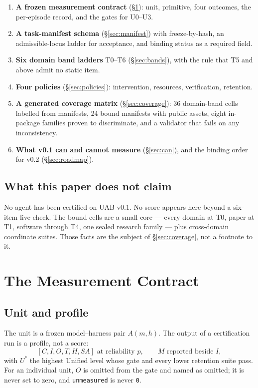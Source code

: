 \begin{enumerate}[leftmargin=*]
\item \textbf{A frozen measurement contract} (\S\ref{sec:contract}): unit, primitive, four outcomes, the per-episode record, and the gates for U0--U3.
\item \textbf{A task-manifest schema} (\S\ref{sec:manifest}) with freeze-by-hash, an admissible-locus ladder for acceptance, and binding status as a required field.
\item \textbf{Six domain band ladders} T0--T6 (\S\ref{sec:bands}), with the rule that T5 and above admit no static item.
\item \textbf{Four policies} (\S\ref{sec:policies}): intervention, resources, verification, retention.
\item \textbf{A generated coverage matrix} (\S\ref{sec:coverage}): 36 domain-band cells labelled from manifests, 24 bound manifests with public assets, eight in-package families proven to discriminate, and a validator that fails on any inconsistency.
\item \textbf{What v0.1 can and cannot measure} (\S\ref{sec:can}), and the binding order for v0.2 (\S\ref{sec:roadmap}).
\end{enumerate}

\subsection{What this paper does not claim}

No agent has been certified on UAB v0.1. No score appears here beyond a six-item live check. The bound cells are a small core --- every domain at T0, paper at T1, software through T4, one sealed research family --- plus cross-domain coordinate suites. Those facts are the subject of \S\ref{sec:coverage}, not a footnote to it.

\section{The Measurement Contract}\label{sec:contract}

\subsection{Unit and profile}

The unit is a frozen model--harness pair $A(m,h)$. The output of a certification run is a profile, not a score:
\[
[C, I, O, T, H, SA] \text{ at reliability } p, \qquad M \text{ reported beside } I,
\]
with $U^{*}$ the highest Unified level whose gate and every lower retention suite pass. For an individual unit, $O$ is omitted from the gate and named as omitted; it is never set to zero, and \texttt{unmeasured} is never \texttt{0}.

